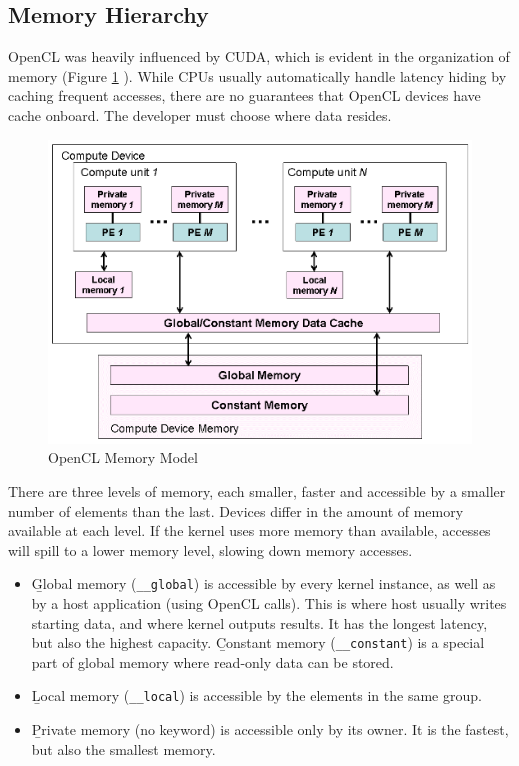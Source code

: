 \subsection{Memory Hierarchy}
OpenCL was heavily influenced by CUDA, which is evident in the organization of memory (Figure \ref{fig:openclmemory} \cite{munshi2009opencl}). While CPUs usually automatically handle latency hiding by caching frequent accesses, there are no guarantees that OpenCL devices have cache onboard. The developer must choose where data resides.

\begin{figure}[h]
    \includegraphics[width=\linewidth]{Figures/memory.png}
    \caption{OpenCL Memory Model}
    \label{fig:openclmemory}
\end{figure}

There are three levels of memory, each smaller, faster and accessible by a smaller number of elements than the last. Devices differ in the amount of memory available at each level. If the kernel uses more memory than available, accesses will spill to a lower memory level, slowing down memory accesses.
\begin{itemize}
    \item \b{Global memory} (\texttt{\_\_global}) is accessible by every kernel instance, as well as by a host application (using OpenCL calls). This is where host usually writes starting data, and where kernel outputs results. It has the longest latency, but also the highest capacity. \b{Constant memory} (\texttt{\_\_constant}) is a special part of global memory where read-only data can be stored.
    \item \b{Local memory} (\texttt{\_\_local}) is accessible by the elements in the same group.
    \item \b{Private memory} (no keyword) is accessible only by its owner. It is the fastest, but also the smallest memory.
\end{itemize}

